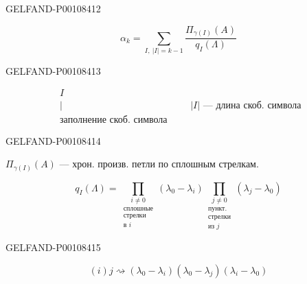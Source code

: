 \begin{GelfandAdjacentEvidence}{GELFAND-P001084}{12}


\begin{equation*}
\alpha_k=\sum_{I,\ \lvert I\rvert=k-1}\frac{\Pi_{\gamma(I)}(A)}{q_I(\Lambda)}
\tag{11}
\end{equation*}
\end{GelfandAdjacentEvidence}
\begin{GelfandAdjacentEvidence}{GELFAND-P001084}{13}


\[
\begin{array}{l}
I\\[-.3ex]
\vert\\[-.3ex]
\text{заполнение скоб. символа}
\end{array}
\qquad
\lvert I\rvert\text{ — длина скоб. символа}
\]
\end{GelfandAdjacentEvidence}
\begin{GelfandAdjacentEvidence}{GELFAND-P001084}{14}


$\Pi_{\gamma(I)}(A)$ — хрон. произв. петли по сплошным стрелкам.

\begin{equation*}
q_I(\Lambda)=
\underset{\substack{\text{сплошные}\\\text{стрелки}\\\text{в }i}}
{\prod_{i\ne0}}(\lambda_0-\lambda_i)
\underset{\substack{\text{пункт.}\\\text{стрелки}\\\text{из }j}}
{\prod_{j\ne0}}(\lambda_j-\lambda_0)
\tag{12}
\end{equation*}
\end{GelfandAdjacentEvidence}
\begin{GelfandAdjacentEvidence}{GELFAND-P001084}{15}


\[
(i)j\rightsquigarrow
(\lambda_0-\lambda_i)(\lambda_0-\lambda_j)(\lambda_i-\lambda_0)
\]
\end{GelfandAdjacentEvidence}



